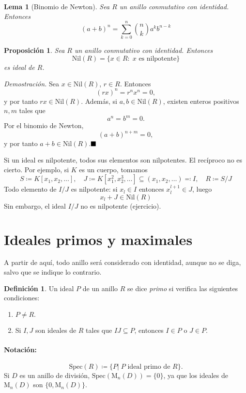 \documentclass[11pt]{book}
\def\Nil{\mathrm{Nil}}
\def\Spec{\mathrm{Spec}}
\def\qed{\hfill\blacksquare}
\newtheorem{lemma}[theorem]{Lema}
\newtheorem{prop}[theorem]{Proposición}
\theoremstyle{definition}
\newtheorem{definition}{Definición}[section]
\begin{document}
\begin{lemma}[Binomio de Newton]
    Sea $R$ un anillo conmutativo con identidad. Entonces\[
    (a+b)^n=\sum_{k=0}^n\binom{n}{k}a^kb^{n-k}
    \]
\end{lemma}

\begin{prop}
    Sea $R$ un anillo conmutativo con identidad. Entonces \[
    \Nil(R)=\{x\in R:\; x\text{ es nilpotente}\}
    \]es ideal de $R$.
\end{prop}
\noindent\textit{Demostración.} Sea $x\in \Nil(R)$, $r\in R$. Entonces\[
(rx)^n=r^nx^n=0,
\]y por tanto $rx\in \Nil(R)$. Además, si $a,b\in\Nil(R)$, existen enteros positivos $n,m$ tales que\[
a^n=b^m=0.
\]Por el binomio de Newton,\[
(a+b)^{n+m}=0,
\]y por tanto $a+b\in\Nil(R)$.$\qed$

Si un ideal es nilpotente, todos sus elementos son nilpotentes. El recíproco no es cierto. Por ejemplo, si $K$ es un cuerpo, tomamos\[
S\coloneq K[x_1,x_2,\dots],\quad J\coloneq K[x_1^2,x_2^3,\dots]\subseteq (x_1,x_2,\dots)\eqqcolon I,\quad R\coloneq S/J
\]Todo elemento de $I/J$ es nilpotente: si $x_l\in I$ entonces $x_l^{l+1}\in J$, luego\[
x_l + J\in\Nil(R)
\]Sin embargo, el ideal $I/J$ no es nilpotente (ejercicio).

\section{Ideales primos y maximales}
A partir de aquí, todo anillo será considerado con identidad, aunque no se diga, salvo que se indique lo contrario.

\begin{definition}
    Un ideal $P$ de un anillo $R$ se dice \textit{primo} si verifica las siguientes condiciones:\begin{enumerate}
        \item $P\neq R$.
        \item Si $I,J$ son ideales de $R$ tales que $IJ\subseteq P$, entonces $I\in P$ o $J\in P$.
        \end{enumerate}
\end{definition}


\paragraph{Notación:}\[
\Spec(R)\coloneq\{P|\; P\text{ ideal primo de }R\}.
\]Si $D$ es un anillo de división, $\Spec(\mathrm M_n(D))=\{0\}$, ya que los ideales de $\mathrm M_n(D)$ son $\{0,\mathrm M_n(D)\}$.
\end{document}
